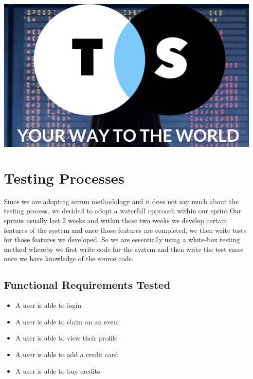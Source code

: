 \documentclass[12pt]{article}
\begin{document}
\begin{titlepage}
	
	
	
	\includegraphics{ticketSaladLogo.png}\\[1cm] %
	 
	
	\vfill %
	
	\end{titlepage}
	
	\section{Testing Processes}
	Since we are adopting scrum methodology and it does not say much about the testing process, we decided to adopt a waterfall approach within our sprint.Our sprints usually last 2 weeks and within those two weeks we develop certain features of the system and once those features are completed, we then write tests for those features we developed. So we are essentially using a white-box testing method whereby we first write code for the system and then write the test cases once we have knowledge of the source code.
	
	\subsection{Functional Requirements Tested}
	\begin{itemize}
		\item A user is able to login
		\item A user is able to claim on an event
		\item A user is able to view their profile
		\item A user is able to add a credit card
		\item A user is able to buy credits
	\end{itemize}
	
\end{document}

